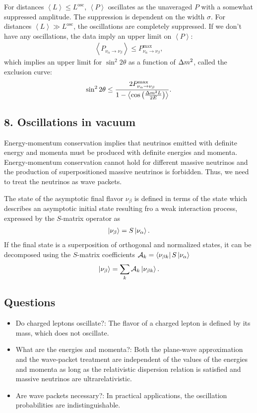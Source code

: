 \documentclass[twocolumn]{article}
\newcommand{\na}{\ensuremath{\nu_\alpha}}
\newcommand{\nb}{\ensuremath{\nu_\beta}}
\renewcommand{\b}{\ensuremath{\beta}}
\newcommand{\avg}[1]{\ensuremath{\left\langle {#1} \right \rangle}}
\newcommand*{\dm}[1][]{%
  \Delta m^2\ifx\\#1\\\else_\text{#1}\fi
}
\begin{document}
For distances $\avg{L} \le L^\text{osc}$, $\avg{P}$ oscillates as the unaveraged $P$ with a somewhat suppressed amplitude. The suppression is dependent on the width $\sigma$. For distances $\avg{L} \gg L^\text{osc}$, the oscillations are completely suppressed.
If we don't have any oscillations, the data imply an upper limit on $\avg{P}$:
\begin{align*}
  \avg{P_{\na \to \nb}} \le P^\text{max}_{\na \to \nb}
,\end{align*}
which implies an upper limit for $\sin^2 2\theta$ as a function of $\dm$, called the exclusion curve:
\begin{align*}
  \sin^2 2\theta \le \frac{2 P^\text{max}_{\na \to \nb}}{1- \avg{\cos \left( \frac{\dm L}{2E} \right)}}
.\end{align*}


\subsection*{8. Oscillations in vacuum}
Energy-momentum conservation implies that neutrinos emitted with definite energy and momenta must be produced with definite energies and momenta. Energy-momentum conservation cannot hold for different massive neutrinos and the production of superpositioned massive neutrinos is forbidden. Thus, we need to treat the neutrinos as wave packets. 

The state of the asymptotic final flavor $\nb$ is defined in terms of the state which describes an asymptotic initial state  resulting fro a weak interaction process, expressed by the $S$-matrix operator as 
\begin{align*}
  \ket{\nb} = S \ket{\na}
.\end{align*}
If the final state is a superposition of orthogonal and normalized states, it can be decomposed using the $S$-matrix coefficients $\mathcal{A}_k = \bra{\nu_{\b k}} S \ket{\na}$ 
\begin{align*}
\ket{\nb} = \sum_k \mathcal{A}_k \ket{\nu_{\b k}}
.\end{align*}
\subsection{Questions}
\begin{itemize}
  \item Do charged leptons oscillate?: The flavor of a charged lepton is defined by its mass, which does not oscillate.
  \item What are the energies and momenta?: Both the plane-wave approximation and the wave-packet treatment are independent of the values of the energies and momenta as long as the relativistic dispersion relation is satisfied and massive neutrinos are ultrarelativistic.
  \item Are wave packets necessary?: In practical applications, the oscillation probabilities are indistinguishable.
\end{itemize}
\end{document}
